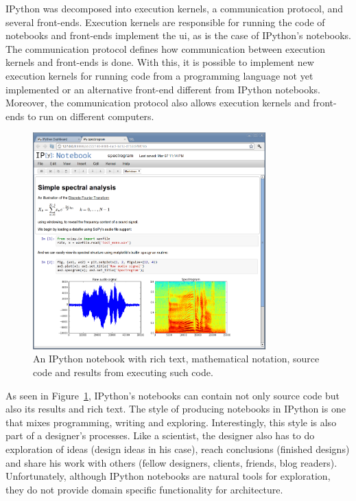 IPython was decomposed into execution kernels, a communication protocol, and several front-ends.
Execution kernels are responsible for running the code of notebooks and front-ends implement the \gls{ui}, as is the case of IPython's notebooks.
The communication protocol defines how communication between execution kernels and front-ends is done.
With this, it is possible to implement new execution kernels for running code from a programming language not yet implemented or an alternative front-end different from IPython notebooks.
Moreover, the communication protocol also allows execution kernels and front-ends to run on different computers\cite{PER-GRA:2007}.

\begin{figure}
	\centering
	\includegraphics[width=0.8\textwidth]{images/ipython_notebook}
	\caption{An IPython notebook with rich text, mathematical notation, source code and results from executing such code.}
	\label{fig:ipython:notebook}
\end{figure}

As seen in Figure~\ref{fig:ipython:notebook}, IPython's notebooks can contain not only source code but also its results and rich text.
The style of producing notebooks in IPython is one that mixes programming, writing and exploring.
Interestingly, this style is also part of a designer's processes.
Like a scientist, the designer also has to do exploration of ideas (design ideas in his case), reach conclusions (finished designs) and share his work with others (fellow designers, clients, friends, blog readers).
Unfortunately, although IPython notebooks are natural tools for exploration, they do not provide domain specific functionality for architecture.


